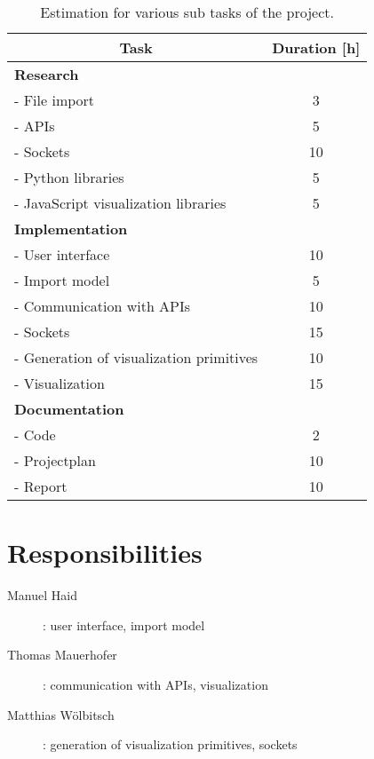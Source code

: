 \documentclass[12pt, a4paper]{article}
\begin{document}
\begin{table}[h!]
\centering
\begin{tabular}{|l|c|}
\hline
\multicolumn{1}{|c|}{\textbf{Task}} & \textbf{Duration [h]} \\ \hline
\textbf{Research} &  \\ \hline
  - File import & 3 \\ \hline
  - APIs & 5 \\ \hline
  - Sockets & 10 \\ \hline
  - Python libraries & 5 \\ \hline
  - JavaScript visualization libraries & 5 \\ \hline
\textbf{Implementation} &  \\ \hline
  - User interface & 10 \\ \hline
  - Import model & 5 \\ \hline
  - Communication with APIs & 10 \\ \hline
  - Sockets & 15 \\ \hline
  - Generation of visualization primitives & 10 \\ \hline
  - Visualization & 15 \\ \hline
\textbf{Documentation} &  \\ \hline
  - Code & 2 \\ \hline
  - Projectplan & 10 \\ \hline
  - Report & 10 \\ \hline
\end{tabular}
\caption{Estimation for various sub tasks of the project.}
\label{tab:timetable}
\end{table}


\section{Responsibilities}

\begin{description}
 \item[Manuel Haid]: user interface, import model
 \item[Thomas Mauerhofer]: communication with APIs, visualization 
 \item[Matthias Wölbitsch]: generation of visualization primitives, sockets
\end{description}
\end{document}
